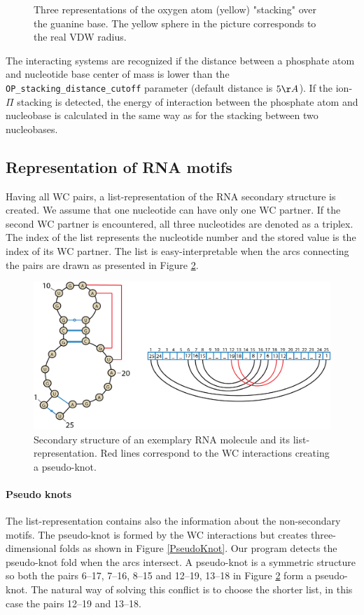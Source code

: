 \documentclass[12pt]{article}
\begin{document}
\begin{figure}[h!]
\begin{center}
{\label{stackingPiexample3}}
\caption{Three representations of the oxygen atom (yellow) "stacking" over the guanine base. The yellow sphere in the \label{stackingPiexample1} picture corresponds to the real VDW radius.}
\label{stackingPiExamples}
\end{center}
\end{figure}
The interacting systems are recognized if the distance between a phosphate atom and nucleotide base center of mass is lower than the \texttt{OP\_stacking\_distance\_cutoff} parameter (default distance is $ 5 \AA$). If the ion-$\Pi$ stacking is detected, the energy of interaction between the phosphate atom and nucleobase is calculated in the same way as for the stacking between two nucleobases. 

\subsection{Representation of RNA motifs}
Having all WC pairs, a list-representation of the RNA secondary structure is created. We assume that one nucleotide can have only one WC partner. If the second WC partner is encountered, all three nucleotides are denoted as a triplex. The index of the list represents the nucleotide number and the stored value is the index of its WC partner. The list is easy-interpretable when the arcs connecting the pairs are drawn as  presented in Figure \ref{SecondaryStructureList}. 

\begin{figure}[h!]
\centering
\includegraphics[width = \textwidth]{./pictures/PseudoKnotArchs.png}
\caption{Secondary structure of an exemplary RNA molecule and its list-representation. Red lines correspond to the WC interactions creating a pseudo-knot.}
\label{SecondaryStructureList}
\end{figure}

\paragraph{Pseudo knots}
The list-representation contains also the information about the non-secondary motifs. The pseudo-knot is formed by the WC interactions but creates three-dimensional folds as shown in Figure \ref{PseudoKnot}. Our program detects the pseudo-knot fold when the arcs intersect. A pseudo-knot is a symmetric structure so both the pairs 6--17, 7--16, 8--15 and 12--19, 13--18 in Figure \ref{SecondaryStructureList} form a pseudo-knot. The natural way of solving this conflict is to choose the shorter list, in this case the pairs 12--19 and 13--18.
  
\end{document}
